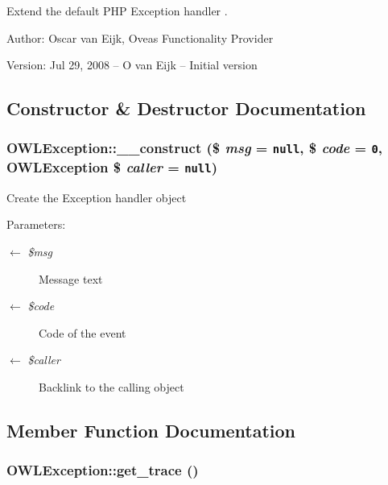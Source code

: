 Extend the default PHP Exception handler . \begin{Desc}
\item[Author:]Oscar van Eijk, Oveas Functionality Provider \end{Desc}
\begin{Desc}
\item[Version:]Jul 29, 2008 -- O van Eijk -- Initial version \end{Desc}


\subsection{Constructor \& Destructor Documentation}
\hypertarget{classOWLException_02821b324b42b7818c3fefe7638444e7}{
\subsubsection{\setlength{\rightskip}{0pt plus 5cm}OWLException::\_\-\_\-construct (\$ {\em msg} = {\tt null}, \$ {\em code} = {\tt 0}, {\bf OWLException} \$ {\em caller} = {\tt null})}}
\label{classOWLException_02821b324b42b7818c3fefe7638444e7}


Create the Exception handler object

\begin{Desc}
\item[Parameters:]
\begin{description}
\item[\mbox{$\leftarrow$} {\em \$msg}]Message text \item[\mbox{$\leftarrow$} {\em \$code}]Code of the event \item[\mbox{$\leftarrow$} {\em \$caller}]Backlink to the calling object \end{description}
\end{Desc}


\subsection{Member Function Documentation}
\hypertarget{classOWLException_bec096884c369f08040443561ac3b164}{
\subsubsection{\setlength{\rightskip}{0pt plus 5cm}OWLException::get\_\-trace ()}}
\label{classOWLException_bec096884c369f08040443561ac3b164}


